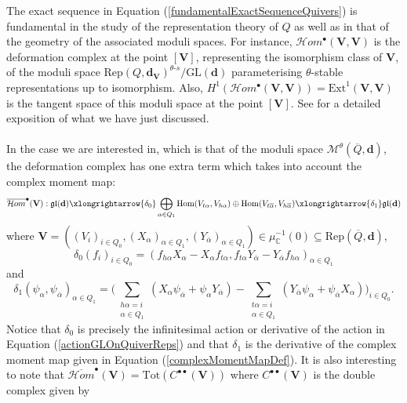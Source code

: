 \documentclass{amsart}
\theoremstyle{plain}
\numberwithin{equation}{section}
\theoremstyle{definition}
\theoremstyle{remark}
\begin{document}
	The exact sequence in Equation (\ref{fundamentalExactSequenceQuivers}) is fundamental in the study of the representation theory of $Q$ as well as in that of the geometry of the associated moduli spaces. For instance, $\mathcal{H}om^\bullet (\mathbf{V},\mathbf{V})$ is the deformation complex at the point $[\mathbf{V}]$, representing the isomorphism class of $\mathbf{V}$, of the moduli space $\text{Rep}(Q,\mathbf{d}_\mathbf{V})^{\theta\text{-}s}/\text{GL}(\mathbf{d})$ parameterising $\theta$-stable representations up to isomorphism. Also, $H^1(\mathcal{H}om^\bullet(\mathbf{V},\mathbf{V}))=\text{Ext}^1(\mathbf{V},\mathbf{V})$ is the tangent space of this moduli space at the point $[\mathbf{V}]$. See \cite[Section 2.2]{libroKirillov} for a detailed exposition of what we have just discussed. 
	\\
	\\
	In the case we are interested in, which is that of the moduli space $\mathcal{M}^{\theta}(\overline{Q},\mathbf{d})$, the deformation complex has one extra term which takes into account the complex moment map:
	\begin{equation}\label{deformationComplexNakajimaQuiverVarieties}
		\overline{\mathcal{H}om}^\bullet(\mathbf{V}):\mathfrak{gl}(\mathbf{d})\xlongrightarrow{\delta_0}\bigoplus_{\alpha\in Q_1}\text{Hom}(V_{t\alpha},V_{h\alpha})\oplus\text{Hom}(V_{t\overline{\alpha}},V_{h\overline{\alpha}})\xlongrightarrow{\delta_1}\mathfrak{gl}(\mathbf{d})
	\end{equation}
	where $\mathbf{V}=((V_i)_{i\in Q_0},(X_\alpha)_{\alpha\in Q_1},(Y_{\overline{\alpha}})_{\alpha\in Q_1})\in \mu^{-1}_\mathbb{C}(0)\subseteq\text{Rep}(\overline{Q},\mathbf{d})$,
	$$
	\delta_0(f_i)_{i\in Q_0}=(f_{h\alpha}X_{\alpha}-X_\alpha f_{t\alpha},f_{t\alpha}Y_{\overline{\alpha}}-Y_{\overline{\alpha}}f_{h\alpha})_{\alpha\in Q_1}
	$$
	and 
	$$
	\delta_1(\psi_\alpha,\psi_{\overline{\alpha}})_{\alpha\in Q_1}=\bigg(\sum_{\substack{h\alpha=i\\\alpha\in Q_1}}(X_\alpha\psi_{\overline{\alpha}}+\psi_\alpha Y_{\overline{\alpha}})-\sum_{\substack{t\alpha=i\\\alpha\in Q_1}}(Y_{\overline{\alpha}}\psi_\alpha+\psi_{\overline{\alpha}}X_\alpha)\bigg)_{i\in Q_0}.
	$$
	Notice that $\delta_0$ is precisely the infinitesimal action or derivative of the action in Equation (\ref{actionGLOnQuiverReps}) and that $\delta_1$ is the derivative of the complex moment map given in Equation (\ref{complexMomentMapDef}). It is also interesting to note that $\overline{\mathcal{H}om}^\bullet(\mathbf{V})=\text{Tot}(C^{\bullet\bullet}(\mathbf{V}))$ where $C^{\bullet\bullet}(\mathbf{V})$ is the double complex given by 
\end{document}
